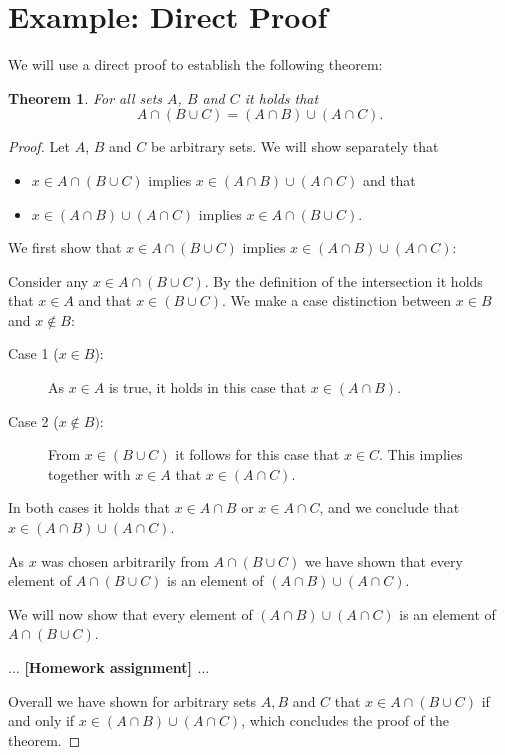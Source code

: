\documentclass{article}
\newtheorem{theorem}{Theorem}
\begin{document}
\clearpage
\section{Example: Direct Proof}

We will use a direct proof to establish the following theorem:

\begin{theorem}
    For all sets $A$, $B$ and $C$ it holds that
    \[A\cap(B\cup C) = (A\cap B) \cup (A\cap C).\]
\end{theorem}
\bigskip

\begin{proof}
Let $A$, $B$ and $C$ be arbitrary sets. We will show separately that 

\begin{itemize}
    \item  $x\in A\cap (B\cup C)$ implies $x\in (A\cap B)\cup(A\cap C)$ and
      that
    \item $x\in (A\cap B) \cup (A\cap C)$ implies $x\in A\cap(B\cup C)$.
\end{itemize}

We first show that $x\in A\cap (B\cup C)$ implies $x\in (A\cap B)\cup(A\cap
C)$:
\smallskip

Consider any $x\in A\cap(B\cup C)$. By the definition of the intersection it holds that
$x\in A$ and that $x\in (B\cup C)$. We make a case distinction between $x\in B$
and $x\notin B$:
\begin{description}
    \item [Case 1 ($x\in B$):] As $x\in A$ is true, it holds in this case that
      $x\in(A\cap B)$.
    \item [Case 2 ($x\notin B)$:] From $x\in (B\cup C)$ it follows for this
      case that $x\in C$. This implies together with $x\in A$ that $x\in (A\cap C)$.
\end{description}

In both cases it holds that $x\in A\cap B$ or $x\in A\cap C$, and we conclude
that $x\in(A\cap B) \cup (A\cap C)$.
\smallskip

As $x$ was chosen arbitrarily from $A\cap(B\cup C)$ we have shown that every
element of $A\cap (B\cup C)$ is an element of $(A\cap B)\cup (A\cap C)$.
\bigskip

We will now show that every element of $(A\cap B) \cup (A\cap C)$ is an element
of $A\cap (B\cup C)$.
\bigskip

$\dots$ \textbf{[Homework assignment] $\dots$}
\bigskip

Overall we have shown for arbitrary sets $A,B$ and $C$ that $x \in A\cap(B\cup
C)$ if and only if $x\in (A\cap B)\cup (A\cap C)$, which concludes the proof of
the theorem.
\end{proof}
\end{document}
